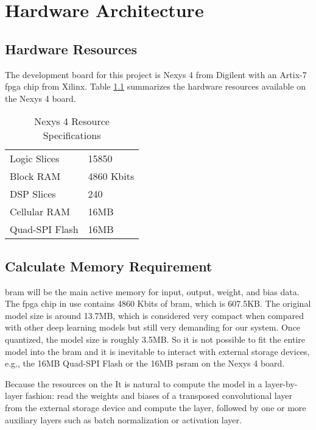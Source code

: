 
\chapter{Hardware Architecture}

\section{Hardware Resources}

The development board for this project is Nexys 4 from Digilent with an Artix-7 \gls{fpga} chip from Xilinx.
Table \ref{table:hardware_resources} summarizes the hardware resources available on the Nexys 4 board.

\begin{table}[h]
  \centering
  \caption{Nexys 4 Resource Specifications}
  \begin{tabular}{l | l}
    Logic Slices & 15850 \\
    Block RAM & 4860 Kbits \\
    DSP Slices & 240 \\
    Cellular RAM & 16MB \\
    Quad-SPI Flash & 16MB
  \end{tabular}
  \label{table:hardware_resources}
\end{table}

\section{Calculate Memory Requirement}

\gls{bram} will be the main active memory for input, output, weight, and bias data. The \gls{fpga} chip in use
contains 4860 Kbits of \gls{bram}, which is 607.5KB. The original model size is around 13.7MB, which is
considered very compact when compared with other deep learning models but still very demanding for
our system. Once quantized, the model size is roughly 3.5MB. So it is not possible to fit the entire model
into the \gls{bram} and it is inevitable to interact with external storage devices, e.g., the 16MB Quad-SPI
Flash or the 16MB \gls{psram} on the Nexys 4 board.

Because the resources on the It is natural to compute the model in a layer-by-layer fashion: read
the weights and biases of a transposed convolutional layer from the external storage device and compute the
layer, followed by one or more auxiliary layers such as batch normalization or activation layer.


